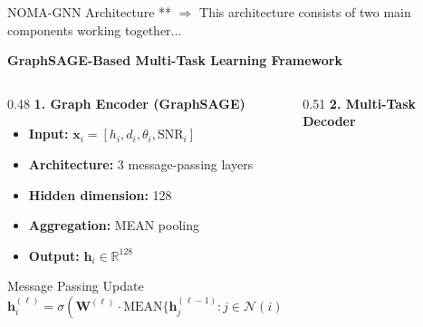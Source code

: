 \documentclass[aspectratio=169]{beamer}
\begin{document}
\begin{frame}{NOMA-GNN Architecture}
    \vspace{-0.2cm}
    \small \textcolor{iiitblue}{** $\Rightarrow$ This architecture consists of two main components working together...}
    \vspace{-.1cm}
    \begin{center}
        \textbf{GraphSAGE-Based Multi-Task Learning Framework}
    \end{center}
    
    
    
    \begin{columns}[T]
        \begin{column}{0.48\textwidth}    \vspace{-.2cm}
            \textbf{1. Graph Encoder (GraphSAGE)}
            \begin{itemize}\itemsep0.1em
                \item \textbf{Input:} $\mathbf{x}_i = [h_i, d_i, \theta_i, \text{SNR}_i]$
                \item \textbf{Architecture:} 3 message-passing layers
                \item \textbf{Hidden dimension:} 128
                \item \textbf{Aggregation:} MEAN pooling
                \item \textbf{Output:} $\mathbf{h}_i \in \mathbb{R}^{128}$
            \end{itemize}
            
            \vspace{0.2cm}
            
            \begin{block}{Message Passing Update}
                \small
                \vspace{-0.1cm}
                \begin{equation*}
                    \mathbf{h}_i^{(\ell)} = \sigma\left( \mathbf{W}^{(\ell)} \cdot \text{MEAN}\{\mathbf{h}_j^{(\ell-1)} : j \in \mathcal{N}(i)\} \right)
                \end{equation*}
                \vspace{-0.2cm}
            \end{block}
        \end{column}
        \begin{column}{0.51\textwidth}    \vspace{-.2cm}
            \textbf{2. Multi-Task Decoder}
            

\end{column}
\end{columns}
\end{frame}
\end{document}
